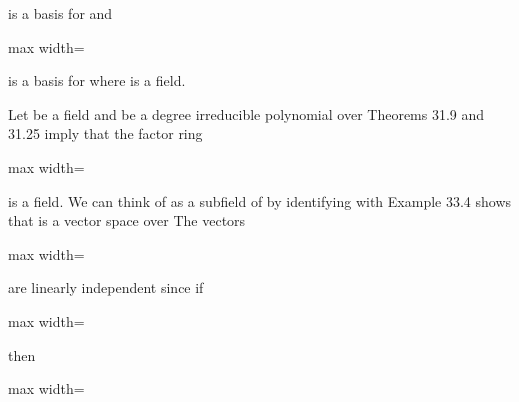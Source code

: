 \documentclass[11pt,oneside]{article}
\begin{document}
\begin{BookBody}
\noindent is a basis for  and

\begin{center}\begin{adjustbox}{max width=\linewidth}\end{adjustbox}\end{center}

\noindent is a basis for  where  is a field. \BookEnd{\blacktriangle}

 Let  be a field and  be a degree  irreducible polynomial over  Theorems 31.9 and 31.25 imply that the factor ring

\begin{center}\begin{adjustbox}{max width=\linewidth}\end{adjustbox}\end{center}

\noindent is a field. We can think of  as a subfield of  by identifying  with  Example 33.4 shows that  is a vector space over  The vectors

\begin{center}\begin{adjustbox}{max width=\linewidth}\end{adjustbox}\end{center}

\noindent are linearly independent since if

\begin{center}\begin{adjustbox}{max width=\linewidth}\end{adjustbox}\end{center}

\noindent then

\begin{center}\begin{adjustbox}{max width=\linewidth}\end{adjustbox}\end{center}


\end{BookBody}
\end{document}
